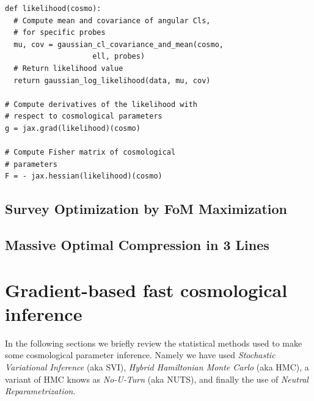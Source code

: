 \documentclass[final,5p,times,twocolumn,authoryear]{elsarticle}
\begin{document}
\begin{verbatim}
def likelihood(cosmo):
  # Compute mean and covariance of angular Cls, 
  # for specific probes
  mu, cov = gaussian_cl_covariance_and_mean(cosmo, 
                    ell, probes)
  # Return likelihood value
  return gaussian_log_likelihood(data, mu, cov)

# Compute derivatives of the likelihood with 
# respect to cosmological parameters
g = jax.grad(likelihood)(cosmo)

# Compute Fisher matrix of cosmological 
# parameters
F = - jax.hessian(likelihood)(cosmo)
\end{verbatim}



\subsection{Survey Optimization by FoM Maximization}

\subsection{Massive Optimal Compression in 3 Lines}


\section{Gradient-based fast cosmological inference}
%
In the following sections we briefly review the statistical methods used to make some cosmological parameter inference. Namely we have used \textit{Stochastic Variational Inference} (aka SVI), \textit{Hybrid Hamiltonian Monte Carlo} (aka HMC), a variant of HMC knows as \textit{No-U-Turn} (aka NUTS), and finally the use of  \textit{Neutral Reparametrization}.   
%
\end{document}
